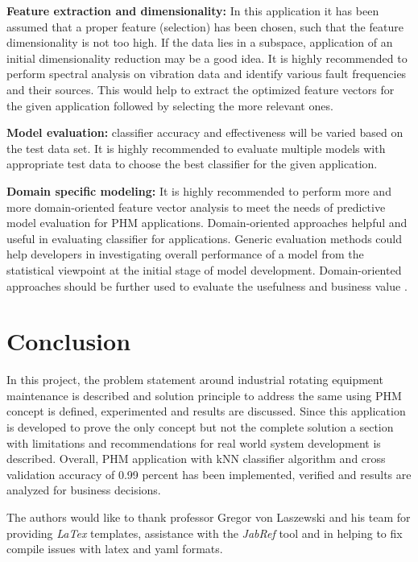 \documentclass[sigconf]{acmart}
\begin{document}
\textbf{Feature extraction and dimensionality:} In this application it has been assumed that a proper feature (selection) has been chosen, such that the feature dimensionality is not too high. If the data lies in a subspace, application of an initial dimensionality reduction may be a good idea. It is highly recommended to perform spectral analysis on vibration data and identify various fault frequencies and their sources. This would help to extract the optimized feature vectors for the given application followed by selecting the more relevant ones. 

\textbf{Model evaluation:} classifier accuracy and effectiveness will be varied based on the test data set. It is highly recommended to evaluate multiple models with appropriate test data to choose the best classifier for the given application.

\textbf{Domain specific modeling:} It is highly recommended to perform more and more domain-oriented feature vector analysis to meet the needs of predictive model evaluation for PHM applications. Domain-oriented approaches helpful and useful in evaluating classifier for applications. Generic evaluation methods could help developers in investigating overall performance of a model from the statistical viewpoint at the initial stage of model development. Domain-oriented approaches should be further used to evaluate the usefulness and business value \cite{Yang2014}.  

\section{Conclusion}
In this project, the problem statement around industrial rotating equipment maintenance is described and solution principle to address the same using PHM concept is defined, experimented and results are discussed. Since this application is developed to prove the only concept but not the complete solution a section with limitations and recommendations for real world system development is described. Overall, PHM application with kNN classifier algorithm and cross validation accuracy of 0.99 percent has been implemented, verified and results are analyzed for business decisions.
\begin{acks}

  The authors would like to thank professor Gregor von Laszewski and his team for providing \textit{LaTex} templates, assistance with the \textit{JabRef} tool and in helping to fix compile issues with latex and yaml formats.

\end{acks}
\end{document}
